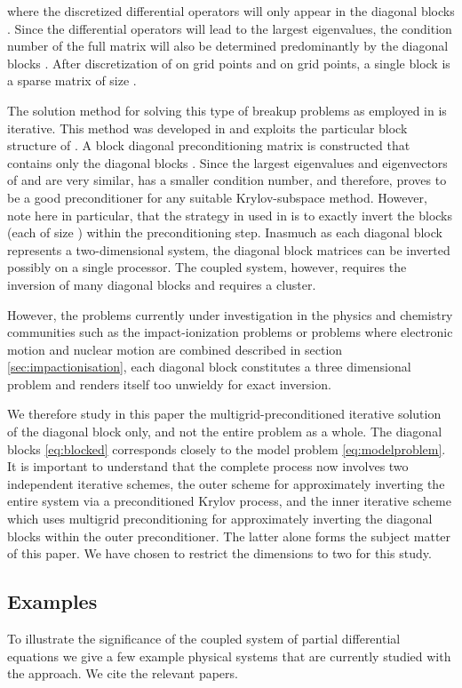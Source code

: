 \documentclass[mathpazo]{cicp}
\theoremstyle{definition}
\numberwithin{equation}{section}
\providecommand{\wv}{}
\providecommand{\hbz}{}
\providecommand{\edt}{}
\begin{document}
where the discretized differential operators will only appear in the
diagonal blocks . Since the differential operators
will lead to the largest eigenvalues, the condition number of the full matrix  will also be determined
predominantly by the diagonal blocks . \edt{
After discretization of
 on  grid points and  on  grid points, a single
block is a sparse matrix of size . }

\hbz{The solution method for solving this type of breakup problems as employed in \cite{Wim05} is iterative. This method was developed in \cite{baertschy2001solution} and exploits the particular block structure of .} A block diagonal preconditioning matrix  is constructed that contains only the diagonal blocks .  Since the largest eigenvalues and eigenvectors of  and  are very similar,  has a smaller condition number, \hbz{and therefore,  proves to be a good preconditioner for any suitable Krylov-subspace method. However, note here in particular, that the strategy in used in \cite{Wim05} is to exactly invert the blocks \edt{(each of size )} within the preconditioning step. Inasmuch as each diagonal block represents a two-dimensional system, the diagonal block matrices can be inverted \edt{possibly} on a single processor. The coupled system, however, requires the inversion of many diagonal blocks and requires a cluster.}

\wv{
However, the problems currently under investigation in the physics and
chemistry communities such as the impact-ionization problems or
problems where electronic motion and nuclear motion are combined
described in section \ref{sec:impactionisation}, each diagonal block
\hbz{constitutes} a three dimensional problem and \hbz{renders itself too unwieldy for exact inversion}}. 

We therefore study in this paper the \hbz{multigrid-preconditioned iterative solution of the diagonal block only, and not the entire problem as a whole. The diagonal blocks \eqref{eq:blocked} corresponds closely to the model problem \eqref{eq:modelproblem}. It is important to understand that the complete process now involves two independent iterative schemes, the outer scheme for approximately inverting the entire system via a preconditioned Krylov process, and the inner iterative scheme which uses multigrid preconditioning for approximately inverting the diagonal blocks within the outer preconditioner. The latter alone forms the subject matter of this paper. We have chosen to restrict the dimensions to two for this study.}


\subsection{Examples}
\wv{To illustrate the significance of the coupled system of partial
differential equations we give a few example physical systems that are
currently studied with the approach. We cite the relevant papers.}
\end{document}
